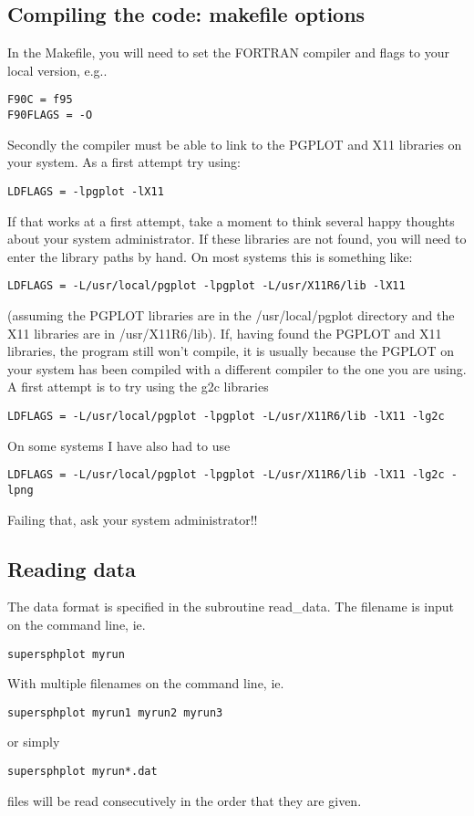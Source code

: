 \documentclass[a4paper,12pt]{article}
\begin{document}
\subsection{Compiling the code: makefile options} 
 In the Makefile, you will need to set the FORTRAN compiler and flags to your local version, e.g..
\begin{verbatim}
F90C = f95
F90FLAGS = -O
\end{verbatim}
 Secondly the compiler must be able to link to the PGPLOT and X11 libraries on
your system. As a first attempt try using:
\begin{verbatim}
LDFLAGS = -lpgplot -lX11
\end{verbatim}
If that works at a first attempt, take a moment to think several happy thoughts about your system
administrator. If these libraries are not found, you will need to enter the
library paths by hand. On most systems this is something like:
\begin{verbatim}
LDFLAGS = -L/usr/local/pgplot -lpgplot -L/usr/X11R6/lib -lX11
\end{verbatim}
(assuming the PGPLOT libraries are in the /usr/local/pgplot directory and the
X11 libraries are in /usr/X11R6/lib). If, having found the PGPLOT and X11
libraries, the program still won't compile, it is usually
because the PGPLOT on your system has been compiled with a different compiler to
the one you are using. A first attempt is to try using the g2c libraries
\begin{verbatim}
LDFLAGS = -L/usr/local/pgplot -lpgplot -L/usr/X11R6/lib -lX11 -lg2c
\end{verbatim}
On some systems I have also had to use
\begin{verbatim}
LDFLAGS = -L/usr/local/pgplot -lpgplot -L/usr/X11R6/lib -lX11 -lg2c -lpng
\end{verbatim}
Failing that, ask your system administrator!!

\subsection{Reading data}
 The data format is specified in the subroutine read\_data.  
The filename is input on the command line, ie.
\begin{verbatim}
supersphplot myrun
\end{verbatim}
With multiple filenames on the command line, ie.
\begin{verbatim}
supersphplot myrun1 myrun2 myrun3
\end{verbatim}
or simply
\begin{verbatim}
supersphplot myrun*.dat
\end{verbatim}
files will be read consecutively in the order that they are given.
\end{document}
